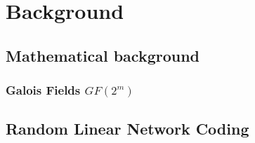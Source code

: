 \chapter{Background}

\section{Mathematical background}

\subsection{Galois Fields $GF(2^m)$}

\section{Random Linear Network Coding}

